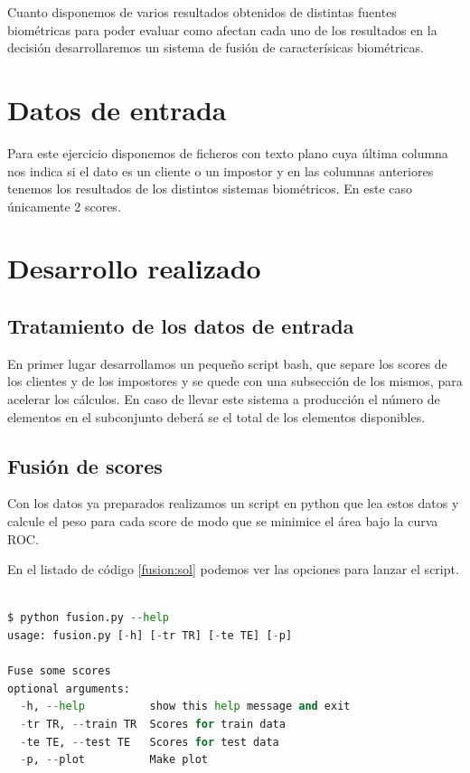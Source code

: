 Cuanto disponemos de varios resultados obtenidos de distintas fuentes biométricas para poder evaluar como afectan cada uno de los resultados en la decisión desarrollaremos un sistema de fusión de caracterísicas biométricas.

\section{Datos de entrada}
Para este ejercicio disponemos de ficheros con texto plano cuya última columna nos indica si el dato es un cliente o un impostor y en las columnas anteriores tenemos los resultados de los distintos sistemas biométricos. En este caso únicamente 2 scores.

\section{Desarrollo realizado}
\subsection{Tratamiento de los datos de entrada}
En primer lugar desarrollamos un pequeño script bash, que separe los scores de los clientes y de los impostores y se quede con una subsección de los mismos, para acelerar los cálculos. En caso de llevar este sistema a producción el número de elementos en el subconjunto deberá se el total de los elementos disponibles.\par

\subsection{Fusión de scores}
Con los datos ya preparados realizamos un script en python que lea estos datos y calcule el peso para cada score de modo que se minimice el área bajo la curva ROC.\par
En el listado de código \ref{fusion:sol} podemos ver las opciones para lanzar el script.\par


\begin{lstlisting}[language=python,label=fusion:uso, caption=PCA cuado n es menor d]

$ python fusion.py --help                         
usage: fusion.py [-h] [-tr TR] [-te TE] [-p]

Fuse some scores
optional arguments:
  -h, --help          show this help message and exit
  -tr TR, --train TR  Scores for train data
  -te TE, --test TE   Scores for test data
  -p, --plot          Make plot
\end{lstlisting}


